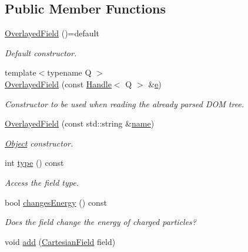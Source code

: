 \subsection*{Public Member Functions}
\begin{DoxyCompactItemize}
\item 
\hyperlink{class_d_d4hep_1_1_geometry_1_1_overlayed_field_ac504446d6cfd14252ba0f4233c38c46f}{Overlayed\+Field} ()=default
\begin{DoxyCompactList}\small\item\em Default constructor. \end{DoxyCompactList}\item 
{\footnotesize template$<$typename Q $>$ }\\\hyperlink{class_d_d4hep_1_1_geometry_1_1_overlayed_field_a388754137517f60f776a090f1de13652}{Overlayed\+Field} (const \hyperlink{class_d_d4hep_1_1_handle}{Handle}$<$ Q $>$ \&\hyperlink{_volumes_8cpp_a8a9a1f93e9b09afccaec215310e64142}{e})
\begin{DoxyCompactList}\small\item\em Constructor to be used when reading the already parsed D\+OM tree. \end{DoxyCompactList}\item 
\hyperlink{class_d_d4hep_1_1_geometry_1_1_overlayed_field_a44b36c5b9d0bdbfd94560b1a663675d4}{Overlayed\+Field} (const std\+::string \&\hyperlink{class_d_d4hep_1_1_handle_a27c7d467a609ab32c133e1f3c7d85ef5}{name})
\begin{DoxyCompactList}\small\item\em \hyperlink{class_d_d4hep_1_1_geometry_1_1_overlayed_field_1_1_object}{Object} constructor. \end{DoxyCompactList}\item 
int \hyperlink{class_d_d4hep_1_1_geometry_1_1_overlayed_field_a4bd3b492dbac69a46a7a695abbbd65de}{type} () const
\begin{DoxyCompactList}\small\item\em Access the field type. \end{DoxyCompactList}\item 
bool \hyperlink{class_d_d4hep_1_1_geometry_1_1_overlayed_field_a78c9cee19da6bc34cc53a048c7057363}{changes\+Energy} () const
\begin{DoxyCompactList}\small\item\em Does the field change the energy of charged particles? \end{DoxyCompactList}\item 
void \hyperlink{class_d_d4hep_1_1_geometry_1_1_overlayed_field_a035b1481dfc0a04b37a31795e3df0ba2}{add} (\hyperlink{class_d_d4hep_1_1_geometry_1_1_cartesian_field}{Cartesian\+Field} field)

\end{DoxyCompactItemize}
